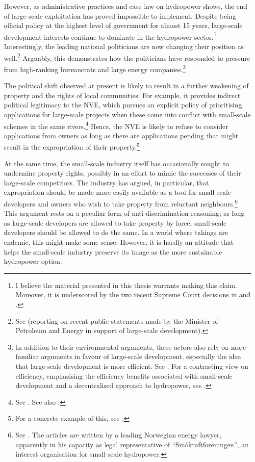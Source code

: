 However, as administrative practices and case law on hydropower shows, the end of large-scale exploitation has proved impossible to implement. Despite being official policy at the highest level of government for almost 15 years, large-scale development interests continue to dominate in the hydropower sector.\footnote{I believe the material presented in this thesis warrants making this claim. Moreover, it is underscored by the two recent Supreme Court decisions in \cite{jorpeland11} and \cite{otra13}.} Interestingly, the leading national politicians are now changing their position as well.\footnote{See \cite{liemin14} (reporting on recent public statements made by the Minister of Petroleum and Energy in support of large-scale development).} Arguably, this demonstrates how the politicians have responded to pressure from high-ranking bureaucrats and large energy companies.\footnote{In addition to their environmental arguments, these actors also rely on more familiar arguments in favour of large-scale development, especially the idea that large-scale development is more efficient. See \cite{lie12}. For a contrasting view on efficiency, emphasising the efficiency benefits associated with small-scale development and a decentralised approach to hydropower, see \cite[5]{inn101}.}

The political shift observed at present is likely to result in a further weakening of property and the rights of local communities. For example, it provides indirect political legitimacy to the NVE, which pursues an explicit policy of prioritising applications for large-scale projects when these come into conflict with small-scale schemes in the same rivers.\footnote{See \cite[3]{nve12}. See also \cite{lie12}.} Hence, the NVE is likely to refuse to consider applications from owners as long as there are applications pending that might result in the expropriation of their property.\footnote{For a concrete example of this, see \cite{smibelg15}.}

At the same time, the small-scale industry itself has occasionally sought to undermine property rights, 
possibly in an effort to mimic the successes of their large-scale competitors. The industry has argued, in particular, that expropriation should be made more easily available as a tool for small-scale developers and owners who wish to take property from reluctant neighbours.\footnote{See \cite{brekken07,brekken08}. The articles are written by a leading Norwegian energy lawyer, apparently in his capacity as legal representative of ``Småkraftforeningen'', an interest organisation for small-scale hydropower.} This argument rests on a peculiar form of anti-discrimination reasoning; as long as large-scale developers are allowed to take property by force, small-scale developers should be allowed to do the same. In a world where takings are endemic, this might make some sense. However, it is hardly an attitude that helps the small-scale industry preserve its image as the more sustainable hydropower option.

